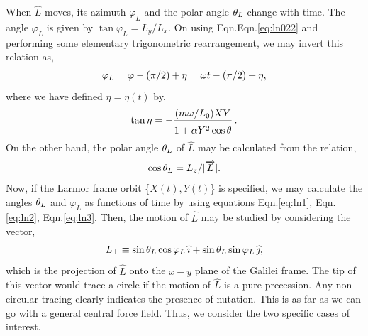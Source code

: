 When $\hat{L}$ moves, its azimuth $\varphi_{L}$ and the 
polar angle ${\theta}_{L}$ change with time. The angle 
$\varphi_{L}$ is given by $\tan \varphi_{L} = L_{y}/L_{x}$. 
On using Eqn.Eqn.\eqref{eq:ln022} and performing some  
elementary trigonometric rearrangement, we may invert this 
relation as,
\begin{align}
 \varphi_{L} = \varphi - (\pi/2) + \eta
    = {\omega} t - (\pi/2) + \eta,
\label{eq:ln1}
\end{align}
where we have defined $\eta = \eta (t)$ by,
\begin{align}
 \tan \eta = -\frac{(m \gkw/{L_{0}}) XY}
    {\rule{0mm}{4mm}1 + \alpha Y^{2} \cos\gkq}\,.
\label{eq:ln2}
\end{align}
On the other hand, the polar angle ${\theta}_{L}$ of $\hat{L}$
may be calculated from the relation,
\begin{align}
\cos {\theta}_{L} = L_{z}/ |\overrightarrow{L}|.
\label{eq:ln3}
\end{align}
Now, if the Larmor frame orbit \{$ X(t), Y(t)$\} is 
specified, we may calculate the angles ${\theta}_{L}$ and 
$\varphi_{L}$ as functions of time by using equations 
Eqn.\eqref{eq:ln1}, Eqn.\eqref{eq:ln2}, Eqn.\eqref{eq:ln3}. 
Then, the motion of $\hat{L}$ may be studied by considering 
the vector,
\begin{align}
 L_{\bot} \equiv \sin {\theta}_{L} \cos \varphi_{L}\, {\widehat{\imath}} 
 + \sin {\theta}_{L} \sin \varphi_{L} \, {\widehat{\jmath}}, \label{eq:ln4}
\end{align}
which is the projection of $\hat{L}$ onto the $x-y$ plane
of the Galilei frame. The tip of this vector would trace a
circle if the motion of $\hat{L}$ is a pure precession.
Any non-circular tracing clearly indicates the presence of
nutation. This is as far as we can go with a general central
force field. Thus, we consider the two specific cases of
interest.

